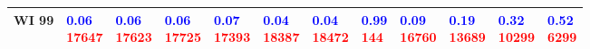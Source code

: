 \begin{tabular}{llllllllllll}
WI 99 & \makecell{\textcolor{blue}{0.06} \\ \textcolor{red}{17647}} & \makecell{\textcolor{blue}{0.06} \\ \textcolor{red}{17623}} & \makecell{\textcolor{blue}{0.06} \\ \textcolor{red}{17725}} & \makecell{\textcolor{blue}{0.07} \\ \textcolor{red}{17393}} & \makecell{\textcolor{blue}{0.04} \\ \textcolor{red}{18387}} & \makecell{\textcolor{blue}{0.04} \\ \textcolor{red}{18472}} & \makecell{\textcolor{blue}{0.99} \\ \textcolor{red}{144}} & \makecell{\textcolor{blue}{0.09} \\ \textcolor{red}{16760}} & \makecell{\textcolor{blue}{0.19} \\ \textcolor{red}{13689}} & \makecell{\textcolor{blue}{0.32} \\ \textcolor{red}{10299}} & \makecell{\textcolor{blue}{0.52} \\ \textcolor{red}{6299}} \\
\bottomrule
\end{tabular}
